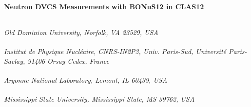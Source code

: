 \begin{titlepage}
     \begin{center}
       \vspace*{-1.8cm}
        
        \\
       \noindent \Huge \textbf{Neutron DVCS Measurements with BONuS12 in 
        CLAS12} \\
     \end{center}
   
\renewcommand{\thefootnote}{\fnsymbol{footnote}}
     \begin{center}

       \vspace*{0.6cm}
        \\
       \vspace*{0.2cm}
       \noindent \emph{Old Dominion University, Norfolk, VA 23529, USA} \\

       \vspace*{0.6cm}
        \\
       \vspace*{0.2cm}
       \noindent \emph{Institut de Physique Nucl\'eaire, CNRS-IN2P3, Univ. Paris-Sud, 
                       Universit\'e Paris-Saclay, 91406 Orsay Cedex, France} \\
      
       \vspace*{0.6cm}
        \\
       \vspace*{0.2cm}
       \noindent \emph{Argonne National Laboratory, Lemont, IL 60439, USA} \\

        \vspace*{0.6cm}
        \\
       \vspace*{0.2cm}
       \noindent \emph{Mississippi State University, Mississippi State, MS 39762, USA} \\


\end{center}
\end{titlepage}
